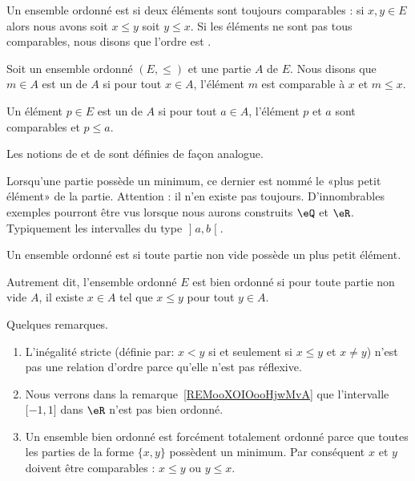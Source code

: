 \begin{definition}      \label{DEFooVGYQooUhUZGr}
    Un ensemble ordonné est  si deux éléments sont toujours comparables : si \( x,y\in E\) alors nous avons soit \( x\leq y\) soit \( y\leq x\). Si les éléments ne sont pas tous comparables, nous disons que l'ordre est .
\end{definition}




\begin{definition}
    Soit un ensemble ordonné \( (E,\leq)\) et une partie \( A\) de \( E\). Nous disons que \( m\in A\) est un  de \( A\) si pour tout \( x\in A\), l'élément \( m\) est comparable à \( x\) et \( m\leq x\).

    Un élément \( p\in E\) est un  de \( A\) si pour tout \( a\in A\), l'élément \( p\) et \( a\) sont comparables et \( p\leq a\).

    Les notions de  et de  sont définies de façon analogue.
\end{definition}

Lorsqu'une partie possède un minimum, ce dernier est nommé le «plus petit élément» de la partie. Attention : il n'en existe pas toujours. D'innombrables exemples pourront être vus lorsque nous aurons construits \( \eQ\) et \( \eR\). Typiquement les intervalles du type \( \mathopen] a , b \mathclose[\).

\begin{definition}   \label{DEFooLJEAooBLGsiS}
    Un ensemble ordonné est  si toute partie non vide possède un plus petit élément.
\end{definition}

Autrement dit, l'ensemble ordonné \( E\) est bien ordonné si pour toute partie non vide \( A\), il existe \( x\in A\) tel que \( x\leq y\) pour tout \( y\in A\).

\begin{normaltext}
    Quelques remarques.
    \begin{enumerate}
        \item
            L'inégalité stricte (définie par: \( x<y\) si et seulement si \( x\leq y\) et \( x\neq y\)) n'est pas une relation d'ordre parce qu'elle n'est pas réflexive.
        \item
            Nous verrons dans la remarque~\ref{REMooXOIOooHjwMvA} que l'intervalle \( \mathopen[ -1 , 1 \mathclose]\) dans \( \eR\) n'est pas bien ordonné.
        \item
            Un ensemble bien ordonné est forcément totalement ordonné parce que toutes les parties de la forme \( \{ x,y \}\) possèdent un minimum. Par conséquent \( x\) et \( y\) doivent être comparables : \( x\leq y\) ou \( y\leq x\).
    \end{enumerate}
\end{normaltext}

